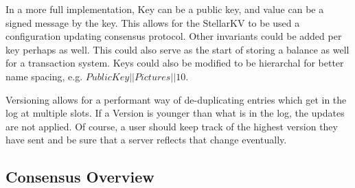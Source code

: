 \documentclass[preprint,11pt]{article} \usepackage{amsmath}
\begin{document}
In a more full implementation, Key can be a public key, and value can
be a signed message by the key. This allows for the StellarKV to be
used a configuration updating consensus protocol. Other invariants
could be added per key perhaps as well. This could also serve as the
start of storing a balance as well for a transaction system. Keys
could also be modified to be hierarchal for better name spacing, e.g.
$Public Key||Pictures||10$.

Versioning allows for a performant way of de-duplicating entries which
get in the log at multiple slots. If a Version is younger than what is
in the log, the updates are not applied. Of course, a user should keep
track of the highest version they have sent and be sure that a server
reflects that change eventually.

\subsection{Consensus Overview}

\begingroup
\raggedright

\endgroup
\end{document}
